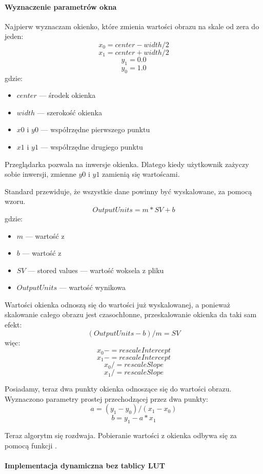 \paragraph{Wyznaczenie parametrów okna}
\par
Najpierw wyznaczam okienko, które zmienia wartości obrazu na skale od zera do jeden:
\[x_0 = center - width / 2\]
\[x_1 = center + width / 2\]
\[y_1 = 0.0\]
\[y_0 = 1.0\]
gdzie:
\begin{itemize}
    \item $center$ --- środek okienka
    \item $width$ --- szerokość okienka
    \item $x0$ i $y0$ --- współrzędne pierwszego punktu
    \item $x1$ i $y1$ --- współrzędne drugiego punktu
\end{itemize}
Przeglądarka pozwala na inwersje okienka.
Dlatego kiedy użytkownik zażyczy sobie inwersji, zmienne $y0$ i $y1$ zamienią się wartoścami.

Standard \DICOM przewiduje, że wszystkie dane powinny być wyskalowane, za pomocą wzoru.
\[OutputUnits = m*SV + b\]
gdzie:
\begin{itemize}
    \item $m$ --- wartość z 
    \item $b$ --- wartość z 
    \item $SV$ --- stored values --- wartość woksela z pliku
    \item $OutputUnits$ --- wartość wynikowa
\end{itemize}

Wartości okienka odnoszą się do wartości już wyskalowanej, a ponieważ skalowanie całego obrazu jest czasochłonne, przeskalowanie okienka da taki sam efekt:
\[(OutputUnits - b ) / m = SV \]
więc:
\[x_0 -= rescaleIntercept\]
\[x_1 -= rescaleIntercept\]
\[x_0 /= rescaleSlope\]
\[x_1 /= rescaleSlope\]

Posiadamy, teraz dwa punkty okienka odnoszące się do wartości obrazu.
Wyznaczono parametry prostej przechodzącej przez dwa punkty:
\[a = (y_1 - y_0) / (x_1 - x_0)\]
\[b = y_1 - a * x_1\]

\par
Teraz algorytm się rozdwaja.
Pobieranie wartości z okienka odbywa się za pomocą funkcji .

\paragraph{Implementacja dynamiczna bez tablicy LUT}

